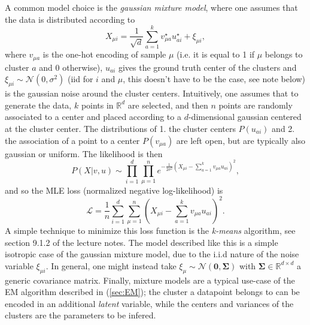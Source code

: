 \documentclass{article}
\begin{document}
A common model choice is the \emph{gaussian mixture model}, where one assumes that the data is distributed according to
\begin{equation}
    X_{\mu i}
    =
    \frac{1}{\sqrt{d}}
    \sum_{a=1}^{k}
    v_{\mu a}^{\star}u_{a i}^{\star} + \xi_{\mu i},
\end{equation}
where $v_{\mu a}$ is the one-hot encoding of sample $\mu$ (i.e. it is equal to 1 if $\mu$ belongs to cluster $a$ and 0 otherwise), $u_{a i}$ gives the ground truth center of the clusters and $\xi_{\mu i} \sim \mathcal{N}(0,\sigma^2)$ (iid for $i$ and $\mu$, this doesn't have to be the case, see note below) is the gaussian noise around the cluster centers. Intuitively, one assumes that to generate the data, $k$ points in $\mathbb{R}^d$ are selected, and then $n$ points are randomly associated to a center and placed according to a $d$-dimensional gaussian centered at the cluster center. The distributions of 1. the cluster centers $P(u_{a i})$ and 2. the association of a point to a center $P(v_{\mu a})$ are left open, but are typically also gaussian or uniform. The likelihood is then
\begin{equation}
    P(X|v,u)
    \sim
    \prod_{i=1}^{d}
    \prod_{\mu=1}^{n}
    e^{-\frac{1}{2\sigma^2}\left(X_{\mu i} - \sum_{a=1}^{k}
    v_{\mu a}u_{a i}\right)^2},
\end{equation}
and so the MLE loss (normalized negative log-likelihood) is
\begin{equation}
    \mathcal{L}
    =
    \frac{1}{n}
    \sum_{i=1}^{d}
    \sum_{\mu=1}^{n}
    \left(X_{\mu i} - \sum_{a=1}^{k}
    v_{\mu a}u_{a i}\right)^2.
\end{equation}
A simple technique to minimize this loss function is the \emph{k-means} algorithm, see section 9.1.2 of the lecture notes. The model described like this is a simple isotropic case of the gaussian mixture model, due to the i.i.d nature of the noise variable $\xi_{\mu i}$. In general, one might instead take $\xi_{\mu} \sim \mathcal{N}(\mathbf{0},\mathbf{\Sigma})$ with $\mathbf{\Sigma} \in \mathbb{R}^{d\times d}$ a generic covariance matrix. Finally, mixture models are a typical use-case of the EM algorithm described in (\ref{sec:EM}); the cluster a datapoint belongs to can be encoded in an additional \emph{latent} variable, while the centers and variances of the clusters are the parameters to be infered.
\end{document}
